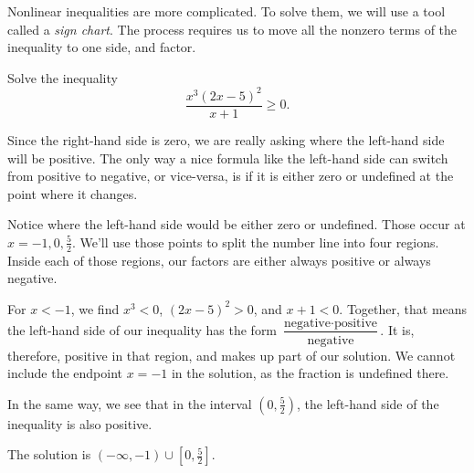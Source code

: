 \documentclass{ximera}
\begin{document}
Nonlinear inequalities are more complicated.  To solve them, we will use a tool called a \emph{sign chart}.
The process requires us to move all the nonzero terms of the inequality to one side, and factor.
\begin{example}
	Solve the inequality \[ \dfrac{x^3 \left(2x-5\right)^2}{x+1} \geq 0.\]

	\begin{explanation}
		Since the right-hand side is zero, we are really asking where the left-hand side will be positive.  The only way
		a nice formula like the left-hand side can switch from positive to negative, or vice-versa, is if it is either zero
		or undefined at the point where it changes.

		Notice where the left-hand side would be either zero or undefined.  Those occur at $x = -1, 0, \frac{5}{2}$.  
		We'll use those points to split the number line into four regions. Inside each of those regions, our factors are either
		always positive or always negative.
		
		
		For $x < -1$, we find $x^3 < 0$, $(2x-5)^2 > 0$, and $x+1 < 0$.  Together, that means the left-hand side of our inequality has the form 
		$\displaystyle \dfrac{ \textrm{negative} \cdot \textrm{positive}}{\textrm{negative}}$.  It is, therefore, positive in that region, and makes up
		part of our solution.  We cannot include the endpoint $x=-1$ in the solution, as the fraction is undefined there.
		
		In the same way, we see that in the interval $\left( 0, \frac{5}{2} \right)$, the left-hand side of the inequality is also positive.  
		
		The solution is $\left( -\infty, -1 \right) \cup \left[ 0, \frac{5}{2} \right]$.
	\end{explanation}
\end{example}
\end{document}
